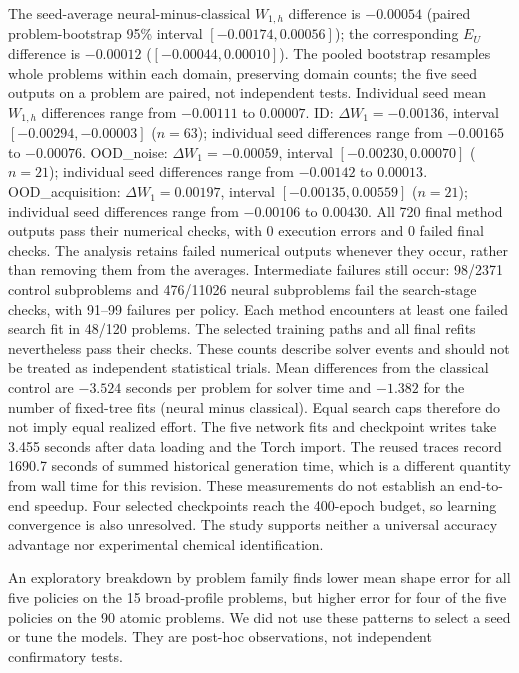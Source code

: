 The seed-average neural-minus-classical $W_{1,h}$ difference is $-0.00054$ (paired problem-bootstrap 95\% interval $[-0.00174, 0.00056]$); the corresponding $E_U$ difference is $-0.00012$ ($[-0.00044, 0.00010]$). The pooled bootstrap resamples whole problems within each domain, preserving domain counts; the five seed outputs on a problem are paired, not independent tests. Individual seed mean $W_{1,h}$ differences range from $-0.00111$ to $0.00007$.
ID: $\Delta W_1=-0.00136$, interval $[-0.00294, -0.00003]$ ($n=63$); individual seed differences range from $-0.00165$ to $-0.00076$. OOD\_noise: $\Delta W_1=-0.00059$, interval $[-0.00230, 0.00070]$ ($n=21$); individual seed differences range from $-0.00142$ to $0.00013$. OOD\_acquisition: $\Delta W_1=0.00197$, interval $[-0.00135, 0.00559]$ ($n=21$); individual seed differences range from $-0.00106$ to $0.00430$.
All 720 final method outputs pass their numerical checks, with 0 execution errors
and 0 failed final checks. The analysis retains failed numerical outputs whenever
they occur, rather than removing them from the averages.
Intermediate failures still occur: 98/2371 control subproblems and 476/11026 neural
subproblems fail the search-stage checks, with 91--99 failures per policy. Each
method encounters at least one failed search fit in 48/120 problems. The selected
training paths and all final refits nevertheless pass their checks. These counts
describe solver events and should not be treated as independent statistical trials.
Mean differences from the classical control are $-3.524$ seconds per problem
for solver time and $-1.382$ for the number of fixed-tree fits (neural minus
classical). Equal search caps therefore do not imply equal realized effort.
The five network fits and checkpoint writes take 3.455 seconds after data loading
and the Torch import. The reused traces record 1690.7 seconds of summed historical
generation time, which is a different quantity from wall time for this revision.
These measurements do not establish an end-to-end speedup. Four selected
checkpoints reach the 400-epoch budget, so learning convergence is also unresolved.
The study supports neither a universal accuracy advantage nor experimental
chemical identification.

An exploratory breakdown by problem family finds lower mean shape error for
all five policies on the 15 broad-profile problems, but higher error for four
of the five policies on the 90 atomic problems. We did not use these patterns
to select a seed or tune the models. They are post-hoc observations, not
independent confirmatory tests.

